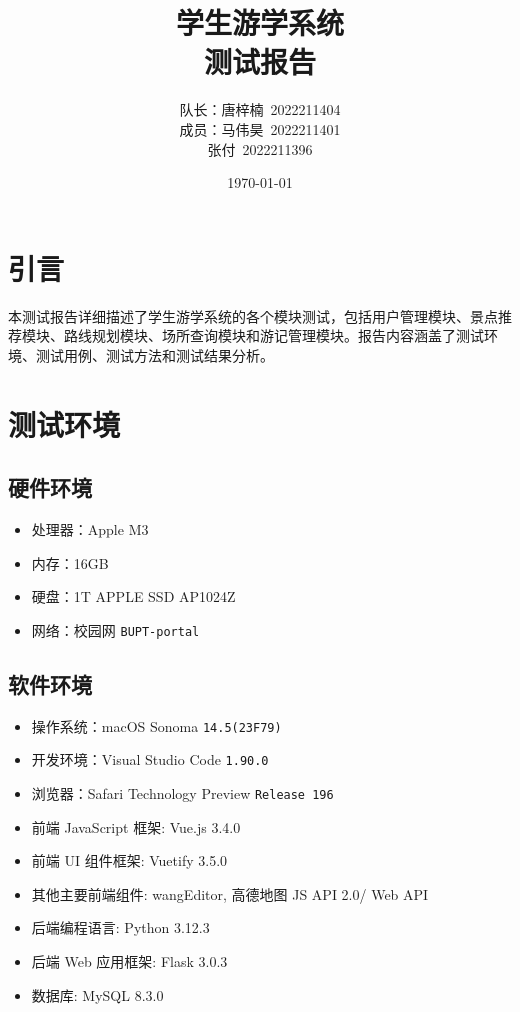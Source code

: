 \documentclass{ctexart}
\title{学生游学系统 \\ 测试报告}
\author{队长：唐梓楠\ 2022211404 \\ 成员：马伟昊\ 2022211401 \\ 张付\ 2022211396}
\date{\today}
\begin{document}
\maketitle

\tableofcontents

\newpage

\section{引言}
本测试报告详细描述了学生游学系统的各个模块测试，包括用户管理模块、景点推荐模块、路线规划模块、场所查询模块和游记管理模块。报告内容涵盖了测试环境、测试用例、测试方法和测试结果分析。

\section{测试环境}
\subsection{硬件环境}
\begin{itemize}
    \item 处理器：Apple M3
    \item 内存：16GB
    \item 硬盘：1T APPLE SSD AP1024Z
    \item 网络：校园网 \verb|BUPT-portal|
\end{itemize}

\subsection{软件环境}
\begin{itemize}
    \item 操作系统：macOS Sonoma \verb|14.5(23F79)|
    \item 开发环境：Visual Studio Code \verb|1.90.0|
    \item 浏览器：Safari Technology Preview \verb|Release 196|
    \item 前端 JavaScript 框架: Vue.js 3.4.0
    \item 前端 UI 组件框架: Vuetify 3.5.0
    \item 其他主要前端组件: wangEditor, 高德地图 JS API 2.0/ Web API
    \item 后端编程语言: Python 3.12.3
    \item 后端 Web 应用框架: Flask 3.0.3
    \item 数据库: MySQL 8.3.0
\end{itemize}
\end{document}
